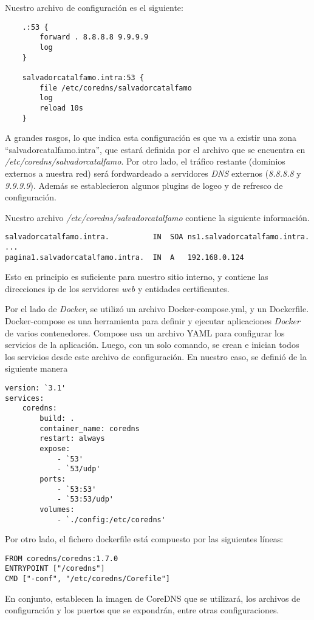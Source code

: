 \noindent Nuestro archivo de configuración es el siguiente:
\begin{verbatim}
    .:53 {
        forward . 8.8.8.8 9.9.9.9
        log
    }

    salvadorcatalfamo.intra:53 {
        file /etc/coredns/salvadorcatalfamo
        log
        reload 10s
    }    
\end{verbatim}

A grandes rasgos, lo que indica esta configuración es que va a existir una zona 
“salvadorcatalfamo.intra”, que estará definida por el archivo que se encuentra en 
\textit{/etc/coredns/salvadorcatalfamo}. Por otro lado, el tráfico restante (dominios 
externos a nuestra red) será fordwardeado a 
servidores \emph{DNS} externos (\textit{8.8.8.8} y \textit{9.9.9.9}). Además se establecieron algunos plugins de logeo y 
de refresco de configuración.

Nuestro archivo \textit{/etc/coredns/salvadorcatalfamo} contiene la siguiente información.
\begin{verbatim}
salvadorcatalfamo.intra.          IN  SOA ns1.salvadorcatalfamo.intra. ...
pagina1.salvadorcatalfamo.intra.  IN  A   192.168.0.124   
\end{verbatim}

Esto en principio es suficiente para nuestro sitio interno, y contiene las direcciones ip de los 
servidores \emph{web} y entidades certificantes.

Por el lado de \emph{Docker}, se utilizó un archivo Docker-compose.yml, y un Dockerfile. 
Docker-compose es una herramienta para definir y ejecutar aplicaciones \emph{Docker} de 
varios contenedores. Compose usa un archivo YAML para configurar los servicios de 
la aplicación. Luego, con un solo comando, se crean e inician todos los servicios 
desde este archivo de configuración. En nuestro caso, se definió de la siguiente 
manera

\begin{verbatim}
version: `3.1'
services:
    coredns:
        build: .
        container_name: coredns
        restart: always
        expose:
            - `53'
            - `53/udp'
        ports:
            - `53:53'
            - `53:53/udp'
        volumes:
            - `./config:/etc/coredns'    
\end{verbatim}

\noindent Por otro lado, el fichero dockerfile está compuesto por las siguientes líneas:
\begin{verbatim}
FROM coredns/coredns:1.7.0
ENTRYPOINT ["/coredns"]
CMD ["-conf", "/etc/coredns/Corefile"]    
\end{verbatim}

En conjunto, establecen la imagen de CoreDNS que se utilizará, los archivos de configuración y
los puertos que se expondrán, entre otras configuraciones.
